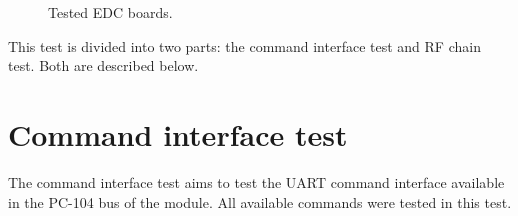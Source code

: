\begin{figure}[!htb]
    \begin{center}

        \caption{Tested EDC boards.}
        \label{fig:edc-boards-test}
    \end{center}
\end{figure}

This test is divided into two parts: the command interface test and RF chain test. Both are described below.

\section{Command interface test}

The command interface test aims to test the UART command interface available in the PC-104 bus of the module. All available commands were tested in this test.

